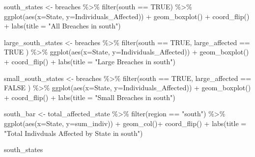 \documentclass[
]{article}
\newenvironment{Shaded}{\begin{snugshade}}{\end{snugshade}}
\newcommand{\AttributeTok}[1]{\textcolor[rgb]{0.77,0.63,0.00}{#1}}
\newcommand{\ConstantTok}[1]{\textcolor[rgb]{0.00,0.00,0.00}{#1}}
\newcommand{\FunctionTok}[1]{\textcolor[rgb]{0.00,0.00,0.00}{#1}}
\newcommand{\NormalTok}[1]{#1}
\newcommand{\OtherTok}[1]{\textcolor[rgb]{0.56,0.35,0.01}{#1}}
\newcommand{\SpecialCharTok}[1]{\textcolor[rgb]{0.00,0.00,0.00}{#1}}
\newcommand{\StringTok}[1]{\textcolor[rgb]{0.31,0.60,0.02}{#1}}
\begin{document}
\begin{Shaded}
\begin{Highlighting}[]
\NormalTok{south\_states }\OtherTok{\textless{}{-}}\NormalTok{ breaches }\SpecialCharTok{\%\textgreater{}\%}
  \FunctionTok{filter}\NormalTok{(south }\SpecialCharTok{==} \ConstantTok{TRUE}\NormalTok{) }\SpecialCharTok{\%\textgreater{}\%}
  \FunctionTok{ggplot}\NormalTok{(}\FunctionTok{aes}\NormalTok{(}\AttributeTok{x=}\NormalTok{State, }\AttributeTok{y=}\NormalTok{Individuals\_Affected)) }\SpecialCharTok{+}
  \FunctionTok{geom\_boxplot}\NormalTok{() }\SpecialCharTok{+} 
  \FunctionTok{coord\_flip}\NormalTok{() }\SpecialCharTok{+}
  \FunctionTok{labs}\NormalTok{(}\AttributeTok{title =} \StringTok{"All Breaches in south"}\NormalTok{)}

\NormalTok{large\_south\_states }\OtherTok{\textless{}{-}}\NormalTok{ breaches }\SpecialCharTok{\%\textgreater{}\%}
  \FunctionTok{filter}\NormalTok{(south }\SpecialCharTok{==} \ConstantTok{TRUE}\NormalTok{, large\_affected }\SpecialCharTok{==} \ConstantTok{TRUE}\NormalTok{ ) }\SpecialCharTok{\%\textgreater{}\%}
  \FunctionTok{ggplot}\NormalTok{(}\FunctionTok{aes}\NormalTok{(}\AttributeTok{x=}\NormalTok{State, }\AttributeTok{y=}\NormalTok{Individuals\_Affected)) }\SpecialCharTok{+}
  \FunctionTok{geom\_boxplot}\NormalTok{() }\SpecialCharTok{+} 
  \FunctionTok{coord\_flip}\NormalTok{() }\SpecialCharTok{+}
  \FunctionTok{labs}\NormalTok{(}\AttributeTok{title =} \StringTok{"Large Breaches in south"}\NormalTok{)}

\NormalTok{small\_south\_states }\OtherTok{\textless{}{-}}\NormalTok{ breaches }\SpecialCharTok{\%\textgreater{}\%}
  \FunctionTok{filter}\NormalTok{(south }\SpecialCharTok{==} \ConstantTok{TRUE}\NormalTok{, large\_affected }\SpecialCharTok{==} \ConstantTok{FALSE}\NormalTok{ ) }\SpecialCharTok{\%\textgreater{}\%}
  \FunctionTok{ggplot}\NormalTok{(}\FunctionTok{aes}\NormalTok{(}\AttributeTok{x=}\NormalTok{State, }\AttributeTok{y=}\NormalTok{Individuals\_Affected)) }\SpecialCharTok{+}
  \FunctionTok{geom\_boxplot}\NormalTok{() }\SpecialCharTok{+} 
  \FunctionTok{coord\_flip}\NormalTok{() }\SpecialCharTok{+}
  \FunctionTok{labs}\NormalTok{(}\AttributeTok{title =} \StringTok{"Small Breaches in south"}\NormalTok{)}

\NormalTok{south\_bar }\OtherTok{\textless{}{-}}\NormalTok{ total\_affected\_state }\SpecialCharTok{\%\textgreater{}\%}
  \FunctionTok{filter}\NormalTok{(region }\SpecialCharTok{==} \StringTok{"south"}\NormalTok{) }\SpecialCharTok{\%\textgreater{}\%}
  \FunctionTok{ggplot}\NormalTok{(}\FunctionTok{aes}\NormalTok{(}\AttributeTok{x=}\NormalTok{State, }\AttributeTok{y=}\NormalTok{sum\_indiv)) }\SpecialCharTok{+}
  \FunctionTok{geom\_col}\NormalTok{()}\SpecialCharTok{+}
  \FunctionTok{coord\_flip}\NormalTok{() }\SpecialCharTok{+}
  \FunctionTok{labs}\NormalTok{(}\AttributeTok{title =} \StringTok{"Total Indivduals Affected by State in south"}\NormalTok{)}

\NormalTok{south\_states}
\end{Highlighting}
\end{Shaded}
\end{document}
